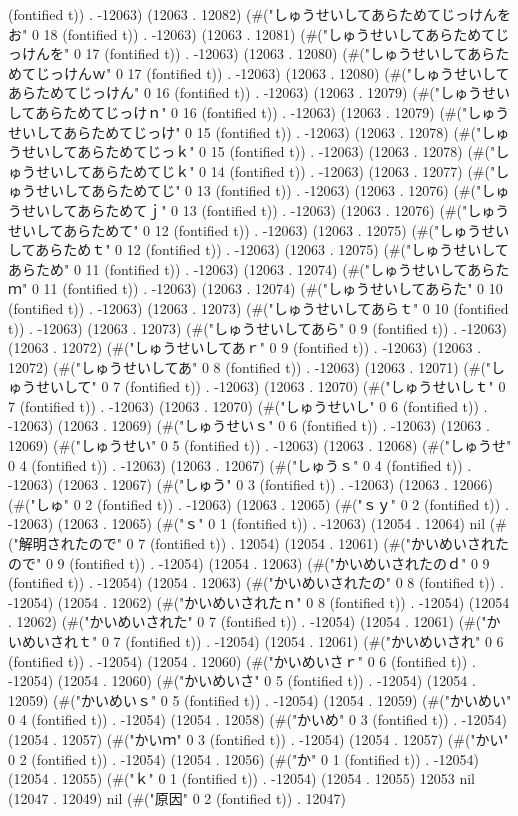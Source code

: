 (fontified t)) . -12063) (12063 . 12082) (#("しゅうせいしてあらためてじっけんをお" 0 18 (fontified t)) . -12063) (12063 . 12081) (#("しゅうせいしてあらためてじっけんを" 0 17 (fontified t)) . -12063) (12063 . 12080) (#("しゅうせいしてあらためてじっけんｗ" 0 17 (fontified t)) . -12063) (12063 . 12080) (#("しゅうせいしてあらためてじっけん" 0 16 (fontified t)) . -12063) (12063 . 12079) (#("しゅうせいしてあらためてじっけｎ" 0 16 (fontified t)) . -12063) (12063 . 12079) (#("しゅうせいしてあらためてじっけ" 0 15 (fontified t)) . -12063) (12063 . 12078) (#("しゅうせいしてあらためてじっｋ" 0 15 (fontified t)) . -12063) (12063 . 12078) (#("しゅうせいしてあらためてじｋ" 0 14 (fontified t)) . -12063) (12063 . 12077) (#("しゅうせいしてあらためてじ" 0 13 (fontified t)) . -12063) (12063 . 12076) (#("しゅうせいしてあらためてｊ" 0 13 (fontified t)) . -12063) (12063 . 12076) (#("しゅうせいしてあらためて" 0 12 (fontified t)) . -12063) (12063 . 12075) (#("しゅうせいしてあらためｔ" 0 12 (fontified t)) . -12063) (12063 . 12075) (#("しゅうせいしてあらため" 0 11 (fontified t)) . -12063) (12063 . 12074) (#("しゅうせいしてあらたｍ" 0 11 (fontified t)) . -12063) (12063 . 12074) (#("しゅうせいしてあらた" 0 10 (fontified t)) . -12063) (12063 . 12073) (#("しゅうせいしてあらｔ" 0 10 (fontified t)) . -12063) (12063 . 12073) (#("しゅうせいしてあら" 0 9 (fontified t)) . -12063) (12063 . 12072) (#("しゅうせいしてあｒ" 0 9 (fontified t)) . -12063) (12063 . 12072) (#("しゅうせいしてあ" 0 8 (fontified t)) . -12063) (12063 . 12071) (#("しゅうせいして" 0 7 (fontified t)) . -12063) (12063 . 12070) (#("しゅうせいしｔ" 0 7 (fontified t)) . -12063) (12063 . 12070) (#("しゅうせいし" 0 6 (fontified t)) . -12063) (12063 . 12069) (#("しゅうせいｓ" 0 6 (fontified t)) . -12063) (12063 . 12069) (#("しゅうせい" 0 5 (fontified t)) . -12063) (12063 . 12068) (#("しゅうせ" 0 4 (fontified t)) . -12063) (12063 . 12067) (#("しゅうｓ" 0 4 (fontified t)) . -12063) (12063 . 12067) (#("しゅう" 0 3 (fontified t)) . -12063) (12063 . 12066) (#("しゅ" 0 2 (fontified t)) . -12063) (12063 . 12065) (#("ｓｙ" 0 2 (fontified t)) . -12063) (12063 . 12065) (#("ｓ" 0 1 (fontified t)) . -12063) (12054 . 12064) nil (#("解明されたので" 0 7 (fontified t)) . 12054) (12054 . 12061) (#("かいめいされたので" 0 9 (fontified t)) . -12054) (12054 . 12063) (#("かいめいされたのｄ" 0 9 (fontified t)) . -12054) (12054 . 12063) (#("かいめいされたの" 0 8 (fontified t)) . -12054) (12054 . 12062) (#("かいめいされたｎ" 0 8 (fontified t)) . -12054) (12054 . 12062) (#("かいめいされた" 0 7 (fontified t)) . -12054) (12054 . 12061) (#("かいめいされｔ" 0 7 (fontified t)) . -12054) (12054 . 12061) (#("かいめいされ" 0 6 (fontified t)) . -12054) (12054 . 12060) (#("かいめいさｒ" 0 6 (fontified t)) . -12054) (12054 . 12060) (#("かいめいさ" 0 5 (fontified t)) . -12054) (12054 . 12059) (#("かいめいｓ" 0 5 (fontified t)) . -12054) (12054 . 12059) (#("かいめい" 0 4 (fontified t)) . -12054) (12054 . 12058) (#("かいめ" 0 3 (fontified t)) . -12054) (12054 . 12057) (#("かいｍ" 0 3 (fontified t)) . -12054) (12054 . 12057) (#("かい" 0 2 (fontified t)) . -12054) (12054 . 12056) (#("か" 0 1 (fontified t)) . -12054) (12054 . 12055) (#("ｋ" 0 1 (fontified t)) . -12054) (12054 . 12055) 12053 nil (12047 . 12049) nil (#("原因" 0 2 (fontified t)) . 12047) 